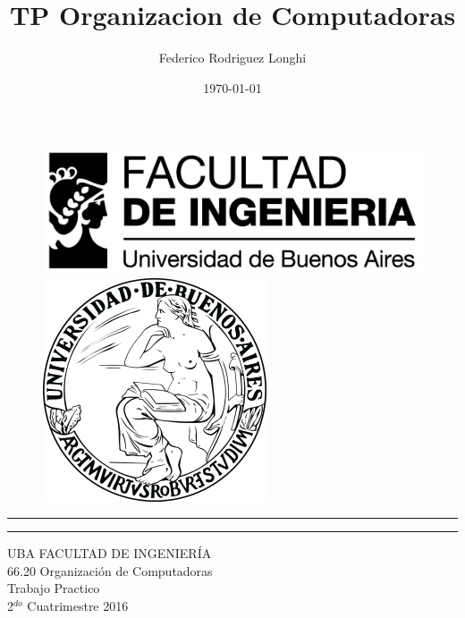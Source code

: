 \documentclass[11pt,a4paper]{article}
\begin{document}
\title{TP Organizacion de Computadoras}
\author{Federico Rodriguez Longhi}		
\date{\today}

\begin{titlepage}
	
	\begin{figure}[H]
		\raggedright
		\includegraphics[scale=0.25]{logo_fiuba2}
		\hfill
		\raggedleft
		\includegraphics[scale=0.2]{logo_uba}
	\end{figure}
	\rule{\textwidth}{1pt}\par %
	\vspace{2pt}\vspace{-\baselineskip} %
	\rule{\textwidth}{0.4pt}\par %
	
	\vspace{0.05\textheight} %
	\centering %
	{\Huge UBA FACULTAD DE INGENIERÍA}\\[0.5\baselineskip]
	{\Large 66.20 Organización de Computadoras}\\[0.5\baselineskip]
	{\Huge Trabajo Practico}\\[0.75\baselineskip]
	{\Large 2$^{do}$ Cuatrimestre 2016}\\[0.5\baselineskip]
	\vspace{0.2\textheight}
	

\end{titlepage}
\end{document}
